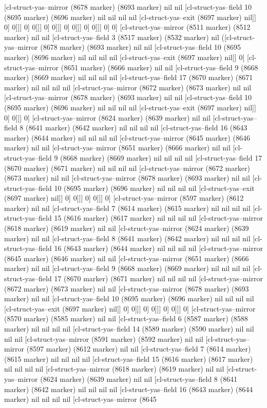 {{[cl-struct-yas--mirror (8678 marker) (8693 marker) nil nil [cl-struct-yas--field 10 (8695 marker) (8696 marker) nil nil nil nil [cl-struct-yas--exit (8697 marker) nil]] 0] 0]]] 0] 0]]] 0] 0]]] 0] 0]]] 0] 0]]] 0] 0] [cl-struct-yas--mirror (8511 marker) (8512 marker) nil nil [cl-struct-yas--field 3 (8517 marker) (8532 marker) nil ([cl-struct-yas--mirror (8678 marker) (8693 marker) nil nil [cl-struct-yas--field 10 (8695 marker) (8696 marker) nil nil nil nil [cl-struct-yas--exit (8697 marker) nil]] 0] [cl-struct-yas--mirror (8651 marker) (8666 marker) nil nil [cl-struct-yas--field 9 (8668 marker) (8669 marker) nil nil nil nil [cl-struct-yas--field 17 (8670 marker) (8671 marker) nil nil nil nil [cl-struct-yas--mirror (8672 marker) (8673 marker) nil nil [cl-struct-yas--mirror (8678 marker) (8693 marker) nil nil [cl-struct-yas--field 10 (8695 marker) (8696 marker) nil nil nil nil [cl-struct-yas--exit (8697 marker) nil]] 0] 0]]] 0] [cl-struct-yas--mirror (8624 marker) (8639 marker) nil nil [cl-struct-yas--field 8 (8641 marker) (8642 marker) nil nil nil nil [cl-struct-yas--field 16 (8643 marker) (8644 marker) nil nil nil nil [cl-struct-yas--mirror (8645 marker) (8646 marker) nil nil [cl-struct-yas--mirror (8651 marker) (8666 marker) nil nil [cl-struct-yas--field 9 (8668 marker) (8669 marker) nil nil nil nil [cl-struct-yas--field 17 (8670 marker) (8671 marker) nil nil nil nil [cl-struct-yas--mirror (8672 marker) (8673 marker) nil nil [cl-struct-yas--mirror (8678 marker) (8693 marker) nil nil [cl-struct-yas--field 10 (8695 marker) (8696 marker) nil nil nil nil [cl-struct-yas--exit (8697 marker) nil]] 0] 0]]] 0] 0]]] 0] [cl-struct-yas--mirror (8597 marker) (8612 marker) nil nil [cl-struct-yas--field 7 (8614 marker) (8615 marker) nil nil nil nil [cl-struct-yas--field 15 (8616 marker) (8617 marker) nil nil nil nil [cl-struct-yas--mirror (8618 marker) (8619 marker) nil nil [cl-struct-yas--mirror (8624 marker) (8639 marker) nil nil [cl-struct-yas--field 8 (8641 marker) (8642 marker) nil nil nil nil [cl-struct-yas--field 16 (8643 marker) (8644 marker) nil nil nil nil [cl-struct-yas--mirror (8645 marker) (8646 marker) nil nil [cl-struct-yas--mirror (8651 marker) (8666 marker) nil nil [cl-struct-yas--field 9 (8668 marker) (8669 marker) nil nil nil nil [cl-struct-yas--field 17 (8670 marker) (8671 marker) nil nil nil nil [cl-struct-yas--mirror (8672 marker) (8673 marker) nil nil [cl-struct-yas--mirror (8678 marker) (8693 marker) nil nil [cl-struct-yas--field 10 (8695 marker) (8696 marker) nil nil nil nil [cl-struct-yas--exit (8697 marker) nil]] 0] 0]]] 0] 0]]] 0] 0]]] 0] [cl-struct-yas--mirror (8570 marker) (8585 marker) nil nil [cl-struct-yas--field 6 (8587 marker) (8588 marker) nil nil nil nil [cl-struct-yas--field 14 (8589 marker) (8590 marker) nil nil nil nil [cl-struct-yas--mirror (8591 marker) (8592 marker) nil nil [cl-struct-yas--mirror (8597 marker) (8612 marker) nil nil [cl-struct-yas--field 7 (8614 marker) (8615 marker) nil nil nil nil [cl-struct-yas--field 15 (8616 marker) (8617 marker) nil nil nil nil [cl-struct-yas--mirror (8618 marker) (8619 marker) nil nil [cl-struct-yas--mirror (8624 marker) (8639 marker) nil nil [cl-struct-yas--field 8 (8641 marker) (8642 marker) nil nil nil nil [cl-struct-yas--field 16 (8643 marker) (8644 marker) nil nil nil nil [cl-struct-yas--mirror (8645 }}
